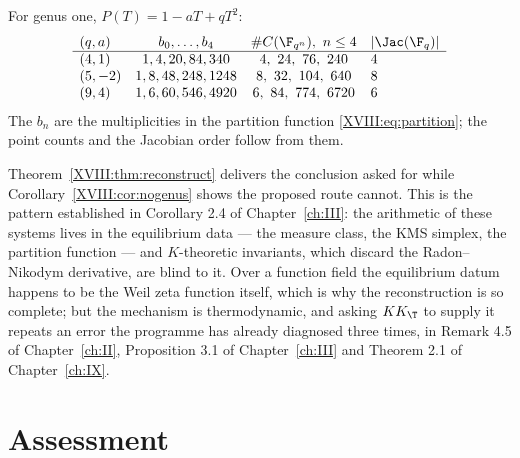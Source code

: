 \begin{example}\label{XVIII:ex:elliptic}
For genus one, $P(T)=1-aT+qT^2$:
\[
\begin{array}{lccl}
(q,a) & b_0,\dots,b_4 & \#C(\F_{q^n}),\ n\le4 & |\Jac(\F_q)|\\\hline
(4,1) & 1,4,20,84,340 & 4,\ 24,\ 76,\ 240 & 4\\
(5,-2) & 1,8,48,248,1248 & 8,\ 32,\ 104,\ 640 & 8\\
(9,4) & 1,6,60,546,4920 & 6,\ 84,\ 774,\ 6720 & 6
\end{array}
\]
The $b_n$ are the multiplicities in the partition function \eqref{XVIII:eq:partition}; the point
counts and the Jacobian order follow from them.
\end{example}

\begin{remark}\label{XVIII:rem:principle}
Theorem~\ref{XVIII:thm:reconstruct} delivers the conclusion asked for while
Corollary~\ref{XVIII:cor:nogenus} shows the proposed route cannot. This is the pattern established
in Corollary 2.4 of Chapter~\ref{ch:III}: the arithmetic of these systems lives in the equilibrium data
--- the measure class, the KMS simplex, the partition function --- and $K$-theoretic
invariants, which discard the Radon--Nikodym derivative, are blind to it. Over a function
field the equilibrium datum happens to be the Weil zeta function itself, which is why the
reconstruction is so complete; but the mechanism is thermodynamic, and asking $KK_\T$ to
supply it repeats an error the programme has already diagnosed three times, in
Remark 4.5 of Chapter~\ref{ch:II}, Proposition 3.1 of Chapter~\ref{ch:III} and Theorem 2.1 of Chapter~\ref{ch:IX}.
\end{remark}

\section{Assessment}

